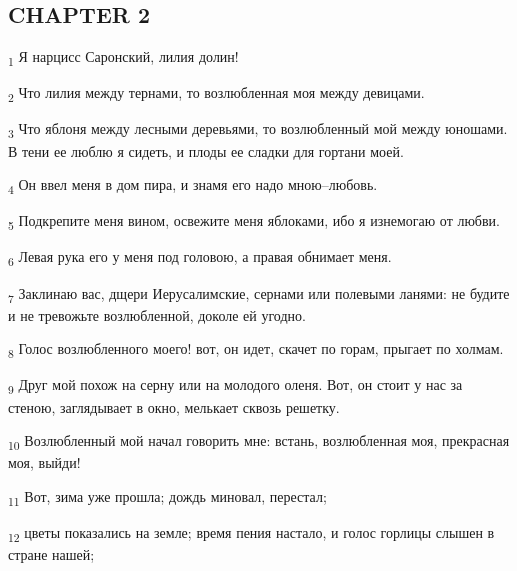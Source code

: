 \subsection{CHAPTER 2}
\begin{tcolorbox}
\textsubscript{1} Я нарцисс Саронский, лилия долин!
\end{tcolorbox}
\begin{tcolorbox}
\textsubscript{2} Что лилия между тернами, то возлюбленная моя между девицами.
\end{tcolorbox}
\begin{tcolorbox}
\textsubscript{3} Что яблоня между лесными деревьями, то возлюбленный мой между юношами. В тени ее люблю я сидеть, и плоды ее сладки для гортани моей.
\end{tcolorbox}
\begin{tcolorbox}
\textsubscript{4} Он ввел меня в дом пира, и знамя его надо мною--любовь.
\end{tcolorbox}
\begin{tcolorbox}
\textsubscript{5} Подкрепите меня вином, освежите меня яблоками, ибо я изнемогаю от любви.
\end{tcolorbox}
\begin{tcolorbox}
\textsubscript{6} Левая рука его у меня под головою, а правая обнимает меня.
\end{tcolorbox}
\begin{tcolorbox}
\textsubscript{7} Заклинаю вас, дщери Иерусалимские, сернами или полевыми ланями: не будите и не тревожьте возлюбленной, доколе ей угодно.
\end{tcolorbox}
\begin{tcolorbox}
\textsubscript{8} Голос возлюбленного моего! вот, он идет, скачет по горам, прыгает по холмам.
\end{tcolorbox}
\begin{tcolorbox}
\textsubscript{9} Друг мой похож на серну или на молодого оленя. Вот, он стоит у нас за стеною, заглядывает в окно, мелькает сквозь решетку.
\end{tcolorbox}
\begin{tcolorbox}
\textsubscript{10} Возлюбленный мой начал говорить мне: встань, возлюбленная моя, прекрасная моя, выйди!
\end{tcolorbox}
\begin{tcolorbox}
\textsubscript{11} Вот, зима уже прошла; дождь миновал, перестал;
\end{tcolorbox}
\begin{tcolorbox}
\textsubscript{12} цветы показались на земле; время пения настало, и голос горлицы слышен в стране нашей;
\end{tcolorbox}
